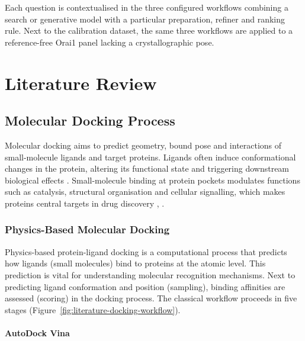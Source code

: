 Each question is contextualised in the three configured workflows combining a search or generative model with a particular preparation, refiner and ranking rule. Next to the calibration dataset, the same three workflows are applied to a reference-free Orai1 panel lacking a crystallographic pose. 

\hypertarget{literature-review}{%
\chapter{\texorpdfstring{Literature Review }{Literature Review }}\label{literature-review}}

\hypertarget{molecular-docking-process}{%
\section{Molecular Docking Process}\label{molecular-docking-process}}

Molecular docking aims to predict geometry, bound pose and interactions of small-molecule ligands and target proteins. Ligands often induce conformational changes in the protein, altering its functional state and triggering downstream biological effects \cite{ref016}. Small-molecule binding at protein pockets modulates functions such as catalysis, structural organisation and cellular signalling, which makes proteins central targets in drug discovery \cite{ref014}, \cite{ref015}.

\hypertarget{physics-based-molecular-docking}{%
\subsection{Physics-Based Molecular Docking}\label{physics-based-molecular-docking}}

Physics-based protein-ligand docking is a computational process that predicts how ligands (small molecules) bind to proteins at the atomic level. This prediction is vital for understanding molecular recognition mechanisms. Next to predicting ligand conformation and position (sampling), binding affinities are assessed (scoring) in the docking process. The classical workflow proceeds in five stages (Figure~\ref{fig:literature-docking-workflow}).

\hypertarget{autodock-vina}{%
\subsubsection{AutoDock Vina}\label{autodock-vina}}

